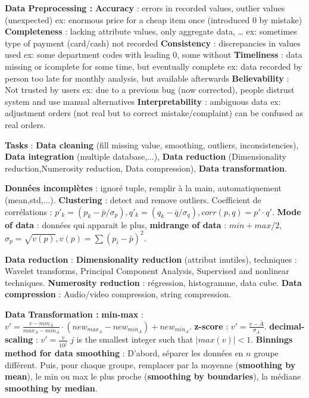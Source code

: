 \documentclass[9pt,a4paper]{report}
\author{Sylvain Julmy}
\begin{document}
\textbf{Data Preprocessing :}
\textbf{Accuracy} : errors in recorded values, outlier values (unexpected) ex: enormous price for a cheap item once (introduced 0 by mistake)
\textbf{Completeness} : lacking attribute values, only aggregate data, … ex: sometimes type of payment (card/cash) not recorded
\textbf{Consistency} : discrepancies in values used ex: some department codes with leading 0, some without
\textbf{Timeliness} : data missing or icomplete for some time, but eventually complete ex: data recorded by person too late for monthly analysis, but available afterwards
\textbf{Believability} : Not trusted by users ex: due to a previous bug (now corrected), people distrust system and use manual alternatives
\textbf{Interpretability} : ambiguous data ex: adjustment orders (not real but to correct mistake/complaint) can be confused as real orders.

\textbf{Tasks} : \textbf{Data cleaning} (fill missing value, smoothing, outliers, inconsistencies), \textbf{Data integration} (multiple database,...), \textbf{Data reduction} (Dimensionality reduction,Numerosity reduction, Data compression), \textbf{Data transformation}.

\textbf{Données incomplètes} : ignoré tuple, remplir à la main, automatiquement (mean,std,...). \textbf{Clustering} : detect and remove outliers. Coefficient de corrélations : $p'_k = (p_k-\bar{p}/\sigma_p), q'_k = (q_k-\bar{q}/\sigma_q), corr(p,q)=p'\cdot q'$. \textbf{Mode of data} : données qui apparait le plus, \textbf{midrange of data} : $min + max / 2$, $\sigma_p=\sqrt{v(p)}, v(p)=\sum (p_i-\bar{p})^2$.

\textbf{Data reduction} : \textbf{Dimensionality reduction} (attribut inutiles), techniques : Wavelet transforms, Principal Component Analysis, Supervised and nonlinear techniques. \textbf{Numerosity reduction} : régression, histogramme, data cube. \textbf{Data compression} : Audio/video compression, string compression.

\textbf{Data Transformation :} \textbf{min-max} : $v'=\frac{v - min_A}{max_A - min_A}\cdot (new_{max_A} - new_{min_A})+new_{min_A}$. \textbf{z-score} : $v'=\frac{v-\bar{A}}{\sigma_A}$. \textbf{decimal-scaling} : $v'=\frac{v}{10^j}$  $j$ is the smallest integer such that $|max(v)| < 1$. \textbf{Binnings method for data smoothing} : D'abord, séparer les données en $n$ groupe différent. Puis, pour chaque groupe, remplacer par la moyenne (\textbf{smoothing by mean}), le min ou max le plus proche (\textbf{smoothing by boundaries}), la médiane \textbf{smoothing by median}.
\end{document}
